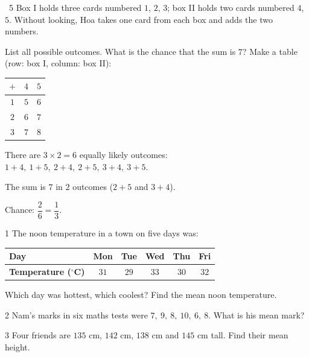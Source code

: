 \begin{exbox}{\ExWord\ 5}
Box I holds three cards numbered $1$, $2$, $3$; box II holds two cards numbered $4$, $5$. Without looking, Hoa takes one card from each box and adds the two numbers.\par
{} List all possible outcomes. \quad {} What is the chance that the sum is $7$?
\guide
{} Make a table (row: box I, column: box II):
\begin{center}
\begin{tabular}{|c|c|c|}
\hline
$+$ & $4$ & $5$\\\hline
$1$ & $5$ & $6$\\\hline
$2$ & $6$ & $7$\\\hline
$3$ & $7$ & $8$\\\hline
\end{tabular}
\end{center}
There are $3\times2=6$ equally likely outcomes: $1+4,\ 1+5,\ 2+4,\ 2+5,\ 3+4,\ 3+5$.\par
{} The sum is $7$ in $2$ outcomes ($2+5$ and $3+4$).\par Chance: $\dfrac26=\dfrac13$.
\end{exbox}
\needspace{5cm}
\begin{probbox}{1}{\relax}
The noon temperature in a town on five days was:
\begin{center}
\begin{tabular}{|l|c|c|c|c|c|}
\hline
\textbf{Day} & Mon & Tue & Wed & Thu & Fri\\\hline
\textbf{Temperature ($^\circ$C)} & $31$ & $29$ & $33$ & $30$ & $32$\\\hline
\end{tabular}
\end{center}
 Which day was hottest, which coolest? \quad {} Find the mean noon temperature.
\end{probbox}
\gap
\begin{probbox}{2}{\relax}
Nam's marks in six maths tests were $7,\ 9,\ 8,\ 10,\ 6,\ 8$. What is his mean mark?
\end{probbox}
\gap
\begin{probbox}{3}{\relax}
Four friends are $135$ cm, $142$ cm, $138$ cm and $145$ cm tall. Find their mean height.
\end{probbox}
